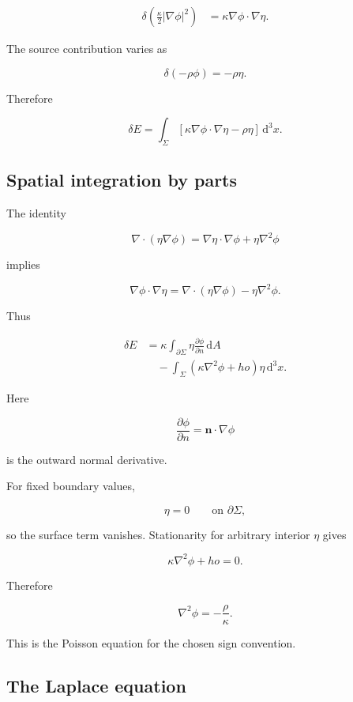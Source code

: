 \[
\begin{aligned}
\delta
\left(
\frac{\kappa}{2}|\nabla\phi|^{2}
\right)
&=
\kappa\nabla\phi\cdot\nabla\eta.
\end{aligned}
\]

The source contribution varies as

\[
\delta(-\rho\phi)
=
-\rho\eta.
\]

Therefore

\[
\delta E
=
\int_{\Sigma}
\left[
\kappa\nabla\phi\cdot\nabla\eta
-
\rho\eta
\right]
\,\mathrm{d}^{3}x.
\]

\subsection{Spatial integration by parts}

The identity

\[
\nabla\cdot(\eta\nabla\phi)
=
\nabla\eta\cdot\nabla\phi
+
\eta\nabla^{2}\phi
\]

implies

\[
\nabla\phi\cdot\nabla\eta
=
\nabla\cdot(\eta\nabla\phi)
-
\eta\nabla^{2}\phi.
\]

Thus

\[
\begin{aligned}
\delta E
&=
\kappa
\int_{\partial\Sigma}
\eta
\frac{\partial\phi}{\partial n}
\,\mathrm{d}A\\
&\quad-
\int_{\Sigma}
\left(
\kappa\nabla^{2}\phi+
ho
\right)
\eta
\,\mathrm{d}^{3}x.
\end{aligned}
\]

Here

\[
\frac{\partial\phi}{\partial n}
=
\mathbf{n}\cdot\nabla\phi
\]

is the outward normal derivative.

For fixed boundary values,

\[
\eta=0
\qquad
\text{on }\partial\Sigma,
\]

so the surface term vanishes. Stationarity for arbitrary interior \(\eta\) gives

\[
\kappa\nabla^{2}\phi+
ho=0.
\]

Therefore

\[
\boxed{
\nabla^{2}\phi
=
-\frac{\rho}{\kappa}
}.
\]

This is the Poisson equation for the chosen sign convention.

\subsection{The Laplace equation}

